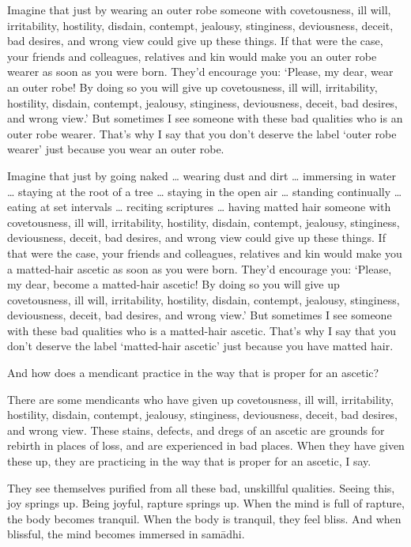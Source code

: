 \documentclass[12pt,openany]{book}%
\begin{document}
Imagine that just by wearing an outer robe someone with covetousness, ill will, irritability, hostility, disdain, contempt, jealousy, stinginess, deviousness, deceit, bad desires, and wrong view could give up these things. If that were the case, your friends and colleagues, relatives and kin would make you an outer robe wearer as soon as you were born. They’d encourage you: ‘Please, my dear, wear an outer robe! By doing so you will give up covetousness, ill will, irritability, hostility, disdain, contempt, jealousy, stinginess, deviousness, deceit, bad desires, and wrong view.’ But sometimes I see someone with these bad qualities who is an outer robe wearer. That’s why I say that you don’t deserve the label ‘outer robe wearer’ just because you wear an outer robe. 

Imagine that just by going naked … wearing dust and dirt … immersing in water … staying at the root of a tree … staying in the open air … standing continually … eating at set intervals … reciting scriptures … having matted hair someone with covetousness, ill will, irritability, hostility, disdain, contempt, jealousy, stinginess, deviousness, deceit, bad desires, and wrong view could give up these things. If that were the case, your friends and colleagues, relatives and kin would make you a matted-hair ascetic as soon as you were born. They’d encourage you: ‘Please, my dear, become a matted-hair ascetic! By doing so you will give up covetousness, ill will, irritability, hostility, disdain, contempt, jealousy, stinginess, deviousness, deceit, bad desires, and wrong view.’ But sometimes I see someone with these bad qualities who is a matted-hair ascetic. That’s why I say that you don’t deserve the label ‘matted-hair ascetic’ just because you have matted hair. 

And how does a mendicant practice in the way that is proper for an ascetic? 

There are some mendicants who have given up covetousness, ill will, irritability, hostility, disdain, contempt, jealousy, stinginess, deviousness, deceit, bad desires, and wrong view. These stains, defects, and dregs of an ascetic are grounds for rebirth in places of loss, and are experienced in bad places. When they have given these up, they are practicing in the way that is proper for an ascetic, I say. 

They see themselves purified from all these bad, unskillful qualities. Seeing this, joy springs up. Being joyful, rapture springs up. When the mind is full of rapture, the body becomes tranquil. When the body is tranquil, they feel bliss. And when blissful, the mind becomes immersed in \textsanskrit{samādhi}. 
\end{document}
